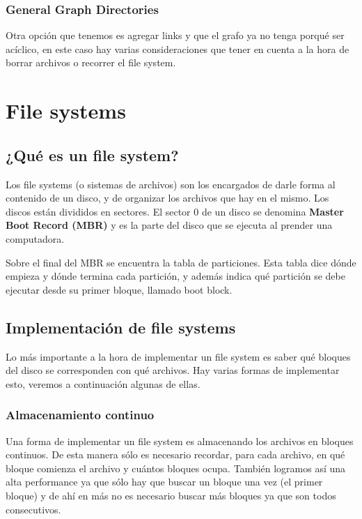 \documentclass{article}
\begin{document}
\subsubsection{General Graph Directories}

Otra opci\'on que tenemos es agregar links y que el grafo ya no tenga porqu\'e ser ac\'iclico, en este caso hay varias consideraciones que tener en cuenta a la hora de borrar archivos o recorrer el file system.

\section{File systems}

\subsection{¿Qu\'e es un file system?}

Los file systems (o sistemas de archivos) son los encargados de darle forma al contenido de un disco, y de organizar los archivos que hay en el mismo. Los discos est\'an divididos en sectores. El sector 0 de un disco se denomina \textbf{Master Boot Record (MBR)} y es la parte del disco que se ejecuta al prender una computadora.

Sobre el final del MBR se encuentra la tabla de particiones. Esta tabla dice d\'onde empieza y d\'onde termina cada partici\'on, y adem\'as indica qu\'e partici\'on se debe ejecutar desde su primer bloque, llamado boot block.

\subsection{Implementaci\'on de file systems}

Lo m\'as importante a la hora de implementar un file system es saber qu\'e bloques del disco se corresponden con qu\'e archivos. Hay varias formas de implementar esto, veremos a continuaci\'on algunas de ellas.

\subsubsection{Almacenamiento continuo}

Una forma de implementar un file system es almacenando los archivos en bloques continuos. De esta manera s\'olo es necesario recordar, para cada archivo, en qu\'e bloque comienza el archivo y cu\'antos bloques ocupa. Tambi\'en logramos as\'i una alta performance ya que s\'olo hay que buscar un bloque una vez (el primer bloque) y de ah\'i en m\'as no es necesario buscar m\'as bloques ya que son todos consecutivos.
\end{document}
